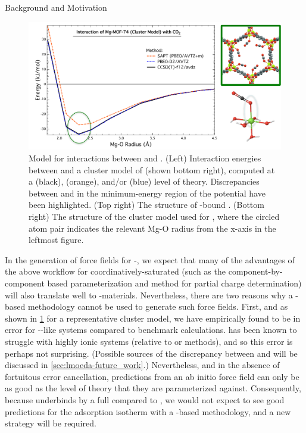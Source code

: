 \begin{section}{Background and Motivation}
    \begin{figure}
    \centering
    \includegraphics[width=1.0\textwidth]{lmoeda/sapt_breakdown.pdf}
    \caption[Model \pes for interactions between \co and \mgmof]
{
Model \pes for interactions between \co and \mgmof.  (Left) Interaction
energies between \co and a cluster model of \mgmof (shown bottom right),
computed at a \ccsdtf (black), \sapt (orange), and/or \pbeod (blue) level of
theory. Discrepancies
between \sapt and \ccsdtf in the minimum-energy region of the potential have
been highlighted. (Top right)
The structure of \co-bound \mgmof. (Bottom right) The structure of the cluster
model used for \mgmof, where the circled atom pair indicates the relevant Mg-O
radius from the x-axis in the leftmost figure.
            }
    \label{fig:lmoeda-sapt_breakdown}
    \end{figure}


In the generation of force fields for \cus-\mofs, we expect that many of the
advantages of the above workflow for coordinatively-saturated \mofs (such as the component-by-component based
parameterization and method for partial charge determination) will also translate
well to \cus-\mof materials. 
Nevertheless, there are two reasons why a \sapt-based methodology
cannot be used to generate such force fields. First, and as shown in
\cref{fig:lmoeda-sapt_breakdown} for a representative \mgmof cluster model,
we have empirically found \sapt to be in error for \cus-\mof-like systems compared to benchmark
\ccsdtf calculations. \dftsapt has been known to struggle with highly
ionic systems (relative to \ccsdt or \dft
methods),\cite{Lao2015a,Pastorczak2017} and so this error is perhaps not surprising.
(Possible sources of the discrepancy between \sapt and \ccsdtf will be
discussed in \cref{sec:lmoeda-future_work}.) Nevertheless, and in the absence of
fortuitous error cancellation,
predictions from an ab initio force field can only be
as good as the
level of theory that they are parameterized against. Consequently, because
\sapt underbinds \co 
by a full  compared to \ccsdtf, we would not expect to see
good predictions for the \co adsorption isotherm with a \sapt-based
methodology, and a new strategy will be required.


\end{section}
